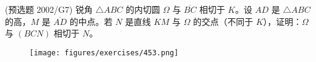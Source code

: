 




\begin{exercise}
    (预选题 2002/G7) 锐角 $\triangle ABC$ 的内切圆 $\Omega$ 与 $\overline{BC}$ 相切于 $K$。设 $AD$ 是 $\triangle ABC$ 的高，$M$ 是 $\overline{AD}$ 的中点。若 $N$ 是直线 $KM$ 与 $\Omega$ 的交点（不同于 $K$），证明：$\Omega$ 与 $(BCN)$ 相切于 $N$。
\end{exercise}
\begin{figure}[H]
    \centering
    \texttt{[image: figures/exercises/453.png]}
\end{figure}